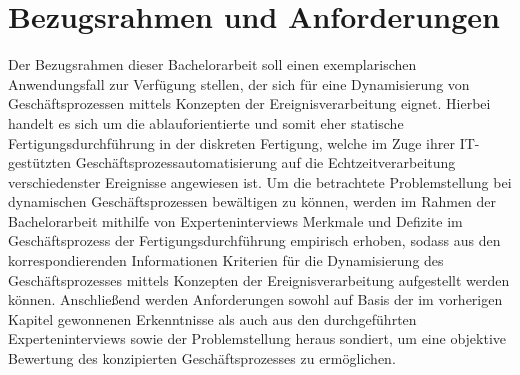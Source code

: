 \chapter{Bezugsrahmen und Anforderungen}\label{ch:Bezugsrahmen}
Der Bezugsrahmen dieser Bachelorarbeit soll einen exemplarischen Anwendungsfall zur Verfügung stellen, der sich für eine Dynamisierung von Geschäftsprozessen mittels Konzepten der Ereignisverarbeitung eignet. Hierbei handelt es sich um die ablauforientierte und somit eher statische Fertigungsdurchführung in der diskreten Fertigung, welche im Zuge ihrer \ac{IT}-gestützten Geschäftsprozessautomatisierung auf die Echtzeitverarbeitung verschiedenster Ereignisse angewiesen ist.
Um die betrachtete Problemstellung bei dynamischen Geschäftsprozessen bewältigen zu können, werden im Rahmen der Bachelorarbeit mithilfe von Experteninterviews Merkmale und Defizite im Geschäftsprozess der Fertigungsdurchführung empirisch erhoben, sodass aus den korrespondierenden Informationen Kriterien für die Dynamisierung des Geschäftsprozesses mittels Konzepten der Ereignisverarbeitung aufgestellt werden können.
Anschließend werden Anforderungen sowohl auf Basis der im vorherigen Kapitel gewonnenen Erkenntnisse als auch aus den durchgeführten Experteninterviews sowie der Problemstellung heraus sondiert, um eine objektive Bewertung des konzipierten Geschäftsprozesses zu ermöglichen.




